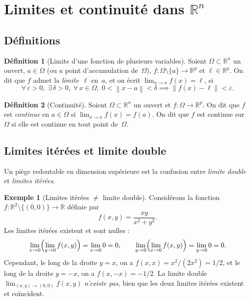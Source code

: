 \documentclass[12pt,a4paper,openany]{book}
\theoremstyle{definition}
\newtheorem{definition}{Définition}[chapter]
\newtheorem{exemple}{Exemple}[chapter]
\newcommand{\R}{\mathbb{R}}
\newcommand{\eps}{\varepsilon}
\newcommand{\norm}[1]{\left\lVert #1 \right\rVert}
\begin{document}
\section{Limites et continuité dans \texorpdfstring{$\R^n$}{Rn}}
\label{sec:limites-continuite-Rn}
\index{continuité!dans $\R^n$}

\subsection{Définitions}

\begin{definition}[Limite d'une fonction de plusieurs variables]\label{def:limite-plusieurs-variables}
  Soient $\Omega \subset \R^n$ un ouvert, $a \in \Omega$ (ou $a$ point d'accumulation de~$\Omega$), $f \colon \Omega \setminus \{a\} \to \R^p$ et $\ell \in \R^p$. On dit que $f$ admet la \emph{limite}~$\ell$ en~$a$, et on écrit $\lim_{x \to a} f(x) = \ell$, si
  \[
    \forall\, \eps > 0,\; \exists\, \delta > 0,\; \forall\, x \in \Omega,\;
    0 < \norm{x - a} < \delta \implies \norm{f(x) - \ell} < \eps.
  \]
\end{definition}

\begin{definition}[Continuité]\label{def:continuite-Rn}
  Soient $\Omega \subset \R^n$ un ouvert et $f \colon \Omega \to \R^p$. On dit que $f$ est \emph{continue} en $a \in \Omega$ si $\lim_{x \to a} f(x) = f(a)$. On dit que $f$ est continue sur~$\Omega$ si elle est continue en tout point de~$\Omega$.
\end{definition}

\subsection{Limites itérées et limite double}

Un piège redoutable en dimension supérieure est la confusion entre \emph{limite double} et \emph{limites itérées}.

\begin{exemple}[Limites itérées $\neq$ limite double]
  \label{ex:limites-iterees}
  Considérons la fonction $f \colon \R^2 \setminus \{(0,0)\} \to \R$ définie par
  \[
    f(x,y) = \frac{xy}{x^2 + y^2}.
  \]
  Les limites itérées existent et sont nulles :
  \[
    \lim_{x \to 0} \Bigl( \lim_{y \to 0} f(x,y) \Bigr) = \lim_{x \to 0} 0 = 0,
    \qquad
    \lim_{y \to 0} \Bigl( \lim_{x \to 0} f(x,y) \Bigr) = \lim_{y \to 0} 0 = 0.
  \]
  Cependant, le long de la droite $y = x$, on a $f(x,x) = x^2/(2x^2) = 1/2$, et le long de la droite $y = -x$, on a $f(x,-x) = -1/2$. La limite double $\lim_{(x,y) \to (0,0)} f(x,y)$ \emph{n'existe pas}, bien que les deux limites itérées existent et coïncident.
\end{exemple}
\end{document}
